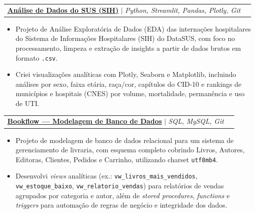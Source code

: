 \documentclass[letterpaper,11pt]{article}
\makeatletter
\newcommand{\resumeItem}[1]{
  \item\small{
    {#1 \vspace{-2pt}}
  }
}
\newcommand{\resumeProjectHeading}[2]{
    \item
    \begin{tabular*}{0.97\textwidth}{l@{\extracolsep{\fill}}r}
      \small#1 & #2 \\
    \end{tabular*}\vspace{-7pt}
}
\newcommand{\resumeItemListStart}{\begin{itemize}}
\newcommand{\resumeItemListEnd}{\end{itemize}\vspace{-5pt}}
\makeatother
\begin{document}
      \resumeProjectHeading{\textbf{\href{https://github.com/Maikoandre/datasus_analysis}{Análise de Dados do SUS (SIH)}} $|$ \emph{Python, Streamlit, Pandas, Plotly, Git}}{}
          \resumeItemListStart{}
            \resumeItem{Projeto de Análise Exploratória de Dados (EDA) das internações hospitalares do Sistema de Informações Hospitalares (SIH) do DataSUS, com foco no processamento, limpeza e extração de insights a partir de dados brutos em formato \texttt{.csv}.}
            \resumeItem{Criei visualizações analíticas com Plotly, Seaborn e Matplotlib, incluindo análises por sexo, faixa etária, raça/cor, capítulos do CID-10 e rankings de municípios e hospitais (CNES) por volume, mortalidade, permanência e uso de UTI.}
          \resumeItemListEnd{}
      \resumeProjectHeading{\textbf{\href{https://github.com/Maikoandre/bookflow}{Bookflow — Modelagem de Banco de Dados}} $|$ \emph{SQL, MySQL, Git}}{}
          \resumeItemListStart{}
            \resumeItem{Projeto de modelagem de banco de dados relacional para um sistema de gerenciamento de livraria, com esquema completo cobrindo Livros, Autores, Editoras, Clientes, Pedidos e Carrinho, utilizando charset \texttt{utf8mb4}.}
            \resumeItem{Desenvolvi \textit{views} analíticas (ex.: \texttt{vw\_livros\_mais\_vendidos}, \texttt{vw\_estoque\_baixo}, \texttt{vw\_relatorio\_vendas}) para relatórios de vendas agrupados por categoria e autor, além de \textit{stored procedures}, \textit{functions} e \textit{triggers} para automação de regras de negócio e integridade dos dados.}
          \resumeItemListEnd{}

\end{document}
